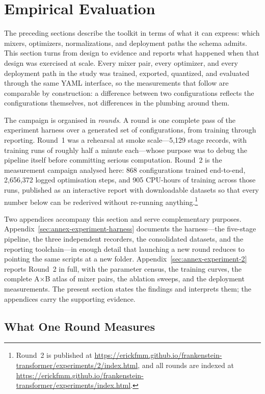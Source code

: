 \section{Empirical Evaluation}
\label{sec:empirical-evaluation}

The preceding sections describe the toolkit in terms of what it can express: which mixers, optimizers, normalizations, and deployment paths the schema admits. This section turns from design to evidence and reports what happened when that design was exercised at scale. Every mixer pair, every optimizer, and every deployment path in the study was trained, exported, quantized, and evaluated through the same YAML interface, so the measurements that follow are comparable by construction: a difference between two configurations reflects the configurations themselves, not differences in the plumbing around them.

The campaign is organised in \emph{rounds}. A round is one complete pass of the experiment harness over a generated set of configurations, from training through reporting. Round~1 was a rehearsal at smoke scale---5{,}129 stage records, with training runs of roughly half a minute each---whose purpose was to debug the pipeline itself before committing serious computation. Round~2 is the measurement campaign analysed here: 868 configurations trained end-to-end, 2{,}656{,}372 logged optimisation steps, and 905 CPU-hours of training across those runs, published as an interactive report with downloadable datasets so that every number below can be rederived without re-running anything.\footnote{Round~2 is published at \url{https://erickfmm.github.io/frankenstein-transformer/experiments/2/index.html}, and all rounds are indexed at \url{https://erickfmm.github.io/frankenstein-transformer/experiments/index.html}.}

Two appendices accompany this section and serve complementary purposes. Appendix~\ref{sec:annex-experiment-harness} documents the harness---the five-stage pipeline, the three independent recorders, the consolidated datasets, and the reporting toolchain---in enough detail that launching a new round reduces to pointing the same scripts at a new folder. Appendix~\ref{sec:annex-experiment-2} reports Round~2 in full, with the parameter census, the training curves, the complete A$\times$B atlas of mixer pairs, the ablation sweeps, and the deployment measurements. The present section states the findings and interprets them; the appendices carry the supporting evidence.

\subsection{What One Round Measures}

